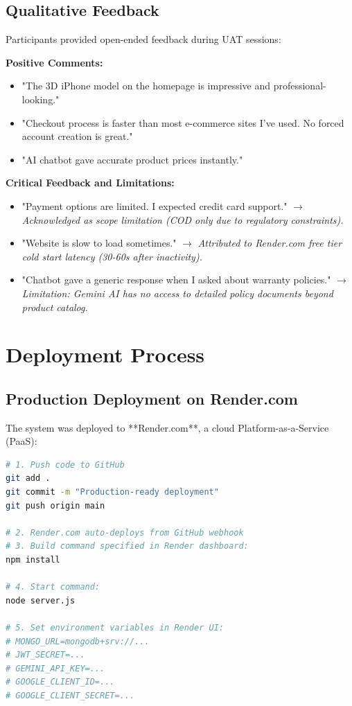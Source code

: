 \documentclass[12pt, a4paper]{report}
\begin{document}
\subsection{Qualitative Feedback}

Participants provided open-ended feedback during UAT sessions:

\textbf{Positive Comments:}
\begin{itemize}
    \item "The 3D iPhone model on the homepage is impressive and professional-looking."
    \item "Checkout process is faster than most e-commerce sites I've used. No forced account creation is great."
    \item "AI chatbot gave accurate product prices instantly."
\end{itemize}

\textbf{Critical Feedback and Limitations:}
\begin{itemize}
    \item "Payment options are limited. I expected credit card support." $\rightarrow$ \textit{Acknowledged as scope limitation (COD only due to regulatory constraints).}
    \item "Website is slow to load sometimes." $\rightarrow$ \textit{Attributed to Render.com free tier cold start latency (30-60s after inactivity).}
    \item "Chatbot gave a generic response when I asked about warranty policies." $\rightarrow$ \textit{Limitation: Gemini AI has no access to detailed policy documents beyond product catalog.}
\end{itemize}

\section{Deployment Process}

\subsection{Production Deployment on Render.com}

The system was deployed to **Render.com**, a cloud Platform-as-a-Service (PaaS):

\begin{lstlisting}[language=bash, caption=Deployment Steps]
# 1. Push code to GitHub
git add .
git commit -m "Production-ready deployment"
git push origin main

# 2. Render.com auto-deploys from GitHub webhook
# 3. Build command specified in Render dashboard:
npm install

# 4. Start command:
node server.js

# 5. Set environment variables in Render UI:
# MONGO_URL=mongodb+srv://...
# JWT_SECRET=...
# GEMINI_API_KEY=...
# GOOGLE_CLIENT_ID=...
# GOOGLE_CLIENT_SECRET=...
\end{lstlisting}
\end{document}
